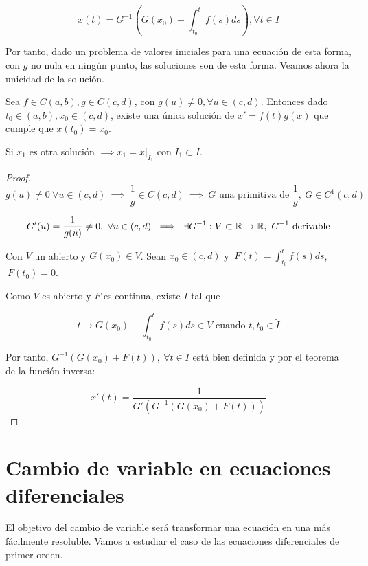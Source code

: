 \[x(t) = G^{-1}\left(G(x_0) + \int_{t_0}^{t}f(s) ds\right), \forall t \in I\]

Por tanto, dado un problema de valores iniciales para una ecuación de esta forma, con $g$ no nula en ningún punto, las soluciones son de esta forma. Veamos ahora la unicidad de la solución.

\begin{nth}
  Sea $f\in C(a,b), g\in C(c,d)$, con $g(u) \neq 0, \forall u \in (c,d)$. Entonces dado $t_0 \in (a,b), x_0 \in (c,d)$, existe una única solución de $x' = f(t)g(x)$ que cumple que $x(t_0) = x_0$.
  
Si $x_1$ es otra solución $\implies x_1 = x|_{I_1}$ con $I_1\subset I$.

\end{nth}



\begin{proof}

\[g(u) \neq 0 \ \forall u \in (c,d) \ \implies \ \frac{1}{g} \in C(c,d) \ \implies \ G \text{ una primitiva de } \frac{1}{g}, \ G\in C^{1}(c,d)\]

\[G'(u) = \frac{1}{g(u)} \neq 0, \ \forall u \in (c,d) \ \implies \ \exists G^{-1}:V\subset \mathbb{R} \to \mathbb{R}, \ G^{-1} \text{ derivable}\]

Con $V$ un abierto y $G(x_0) \in V$.
Sean $x_0 \in (c,d)$ y $\ F(t) = \displaystyle\int_{t_0}^t f(s) ds$, $\ F(t_0) = 0$.

Como $V$ es abierto y $F$ es continua, existe $\tilde{I}$ tal que

\[t \mapsto G(x_0)+\int_{t_0}^t f(s) ds  \in V \text{ cuando } t,t_0 \in \tilde{I}\]

Por tanto, $G^{-1}\left(G(x_0) + F(t)\right), \ \forall t \in I$ está bien definida y por el teorema de la función inversa:

\[x'(t) = \frac{1}{G'(G^{-1}(G(x_0) + F(t)))}\]


\end{proof}

  
\section{Cambio de variable en ecuaciones diferenciales}
El objetivo del cambio de variable será transformar una ecuación en una más fácilmente resoluble.
Vamos a estudiar el caso de las ecuaciones diferenciales de primer orden.


